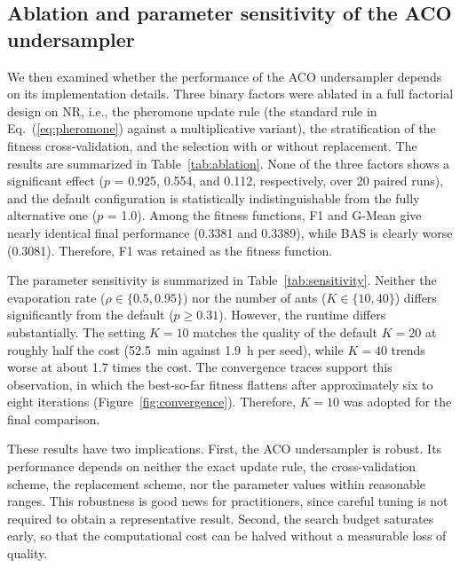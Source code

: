 \documentclass[10pt,a4paper]{article}
\begin{document}
\begin{table}[htbp]
\centering
\caption{The seed sensitivity of a reference SHS-ACO (SMOTE)
configuration on NR over five seeds.}
\label{tab:repro}

\end{table}

\subsection{Ablation and parameter sensitivity of the ACO undersampler}
\label{sec:ablation}
We then examined whether the performance of the ACO undersampler depends
on its implementation details. Three binary factors were ablated in a
full factorial design on NR, i.e., the pheromone update rule (the
standard rule in Eq.~(\ref{eq:pheromone}) against a multiplicative
variant), the stratification of the fitness cross-validation, and the
selection with or without replacement. The results are summarized in
Table~\ref{tab:ablation}. None of the three factors shows a significant
effect ($p$ = 0.925, 0.554, and 0.112, respectively, over 20 paired
runs), and the default configuration is statistically indistinguishable
from the fully alternative one ($p$ = 1.0). Among the fitness functions,
F1 and G-Mean give nearly identical final performance (0.3381 and
0.3389), while BAS is clearly worse (0.3081). Therefore, F1 was retained
as the fitness function.

The parameter sensitivity is summarized in Table~\ref{tab:sensitivity}.
Neither the evaporation rate ($\rho \in \{0.5, 0.95\}$) nor the
number of ants ($K \in \{10, 40\}$) differs significantly from the
default ($p \geq 0.31$). However, the runtime differs substantially. The setting $K = 10$
matches the quality of the default $K = 20$ at roughly half the cost
(52.5~min against 1.9~h per seed), while $K = 40$ trends worse at about 1.7 times the cost. The convergence traces support this observation, in
which the best-so-far fitness flattens after approximately six to eight
iterations (Figure~\ref{fig:convergence}). Therefore, $K = 10$ was
adopted for the final comparison.

These results have two implications. First, the ACO undersampler is
robust. Its performance depends on neither the exact update rule, the
cross-validation scheme, the replacement scheme, nor the parameter
values within reasonable ranges. This robustness is good news for
practitioners, since careful tuning is not required to obtain a
representative result. Second, the search budget saturates early, so
that the computational cost can be halved without a measurable loss of
quality.
\end{document}

